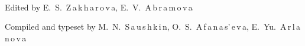 

\thispagestyle{empty}







$\;$












%


%









\bigskip



\bigskip







{

\centering %

\par Edited by E.~S.~Z\,a\,k\,h\,a\,r\,o\,v\,a, E.~V.~A\,b\,r\,a\,m\,o\,v\,a \smallskip

\par Compiled and typeset by M.~N.~S\,a\,u\,s\,h\,k\,i\,n, O.~S.~A\,f\,a\,n\,a\,s'\,e\,v\,a, E.~Yu.~A\,r\,l\,a\,n\,o\,v\,a



 }



